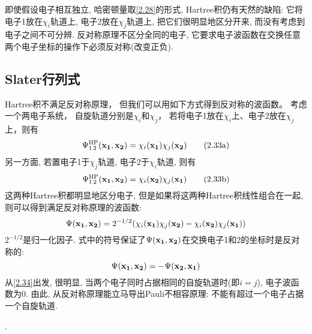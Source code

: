即使假设电子相互独立, 
哈密顿量取\autoref{2.28}的形式, 
Hartree积仍有天然的缺陷: 它将电子1放在$\chi_i$轨道上, 
电子2放在$\chi_j$轨道上, 
把它们很明显地区分开来, 
而没有考虑到电子之间不可分辨. 
反对称原理不区分全同的电子, 
它要求电子波函数在交换任意两个电子坐标的操作下必须反对称(改变正负).

\subsection{Slater行列式}
 \label{sec2.2.3}
Hartree积不满足反对称原理，
但我们可以用如下方式得到反对称的波函数。
考虑一个两电子系统，
自旋轨道分别是$\chi_i$和$\chi_j$，
若将电子1放在$\chi_i$上、电子2放在$\chi_j$上，则有
\begin{equation}
\begin{subequations}
\Psi^{\rm HP}_{1\,2}(\bo{x_1,x_2})=\chi_i(\bo{x_1})\chi_j(\bo{x_2})\tag{2.33a}
\end{subequations}
\end{equation}
\label{2.33a}
另一方面, 
若置电子1于$\chi_j$轨道, 
电子2于$\chi_i$轨道, 
则有
\begin{equation*}
\addtocounter{equation}{-1}
\Psi^{\rm HP}_{1\,2}(\bo{x_1,x_2})=\chi_i(\bo{x_2})\chi_j(\bo{x_1})\tag{2.33b}
\end{equation*}
\label{2.33b}
这两种Hartree积都明显地区分电子, 
但是如果将这两种Hartree积线性组合在一起, 
则可以得到满足反对称原理的波函数:
\begin{equation}
\label{2.34}
\Psi(\mathbf{x_1,x_2})=2^{-1/2}(\chi_i(\mathbf{x_1})\chi_j(\mathbf{x_2})-\chi_i(\mathbf{x_2})\chi_j(\mathbf{x_1}))
\end{equation}
$2^{-1/2}$是归一化因子. 式中的符号保证了$\Psi(\mathbf{x_1,x_2})$在交换电子1和2的坐标时是反对称的:
\begin{equation}
\Psi(\mathbf{x_1,x_2})=-\Psi(\mathbf{x_2,x_1})
\end{equation}
从\autoref{2.34}出发, 
很明显, 
当两个电子同时占据相同的自旋轨道时(即$i=j$), 
电子波函数为0. 
由此, 
从反对称原理能立马导出Pauli不相容原理: 不能有超过一个电子占据一个自旋轨道.


.


